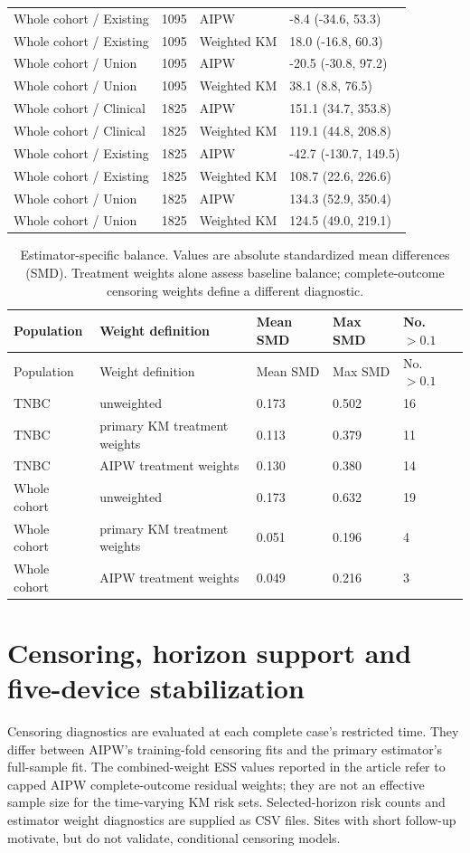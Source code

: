 \documentclass[12pt,letterpaper]{article}
\begin{document}
\begin{longtable}{p{1.6in}p{0.65in}p{1.1in}p{2.45in}}
Whole cohort / Existing & 1095 & AIPW & -8.4 (-34.6, 53.3) \\
Whole cohort / Existing & 1095 & Weighted KM & 18.0 (-16.8, 60.3) \\
Whole cohort / Union & 1095 & AIPW & -20.5 (-30.8, 97.2) \\
Whole cohort / Union & 1095 & Weighted KM & 38.1 (8.8, 76.5) \\
Whole cohort / Clinical & 1825 & AIPW & 151.1 (34.7, 353.8) \\
Whole cohort / Clinical & 1825 & Weighted KM & 119.1 (44.8, 208.8) \\
Whole cohort / Existing & 1825 & AIPW & -42.7 (-130.7, 149.5) \\
Whole cohort / Existing & 1825 & Weighted KM & 108.7 (22.6, 226.6) \\
Whole cohort / Union & 1825 & AIPW & 134.3 (52.9, 350.4) \\
Whole cohort / Union & 1825 & Weighted KM & 124.5 (49.0, 219.1) \\
\end{longtable}
\begin{longtable}{p{1.0in}p{2.1in}p{0.8in}p{0.8in}p{0.9in}}
\caption{Estimator-specific balance. Values are absolute standardized mean differences (SMD). Treatment weights alone assess baseline balance; complete-outcome censoring weights define a different diagnostic.}\\
\toprule
Population & Weight definition & Mean SMD & Max SMD & No. $>0.1$ \\
\midrule\endfirsthead
\toprule
Population & Weight definition & Mean SMD & Max SMD & No. $>0.1$ \\
\midrule\endhead
\bottomrule\endfoot
TNBC & unweighted & 0.173 & 0.502 & 16 \\
TNBC & primary KM treatment weights & 0.113 & 0.379 & 11 \\
TNBC & AIPW treatment weights & 0.130 & 0.380 & 14 \\
Whole cohort & unweighted & 0.173 & 0.632 & 19 \\
Whole cohort & primary KM treatment weights & 0.051 & 0.196 & 4 \\
Whole cohort & AIPW treatment weights & 0.049 & 0.216 & 3 \\
\end{longtable}
\section{Censoring, horizon support and five-device stabilization}
Censoring diagnostics are evaluated at each complete case's restricted time. They differ between AIPW's
training-fold censoring fits and the primary estimator's full-sample fit. The combined-weight ESS values
reported in the article refer to capped AIPW complete-outcome residual weights; they are not an effective
sample size for the time-varying KM risk sets. Selected-horizon risk counts and estimator weight diagnostics
are supplied as CSV files. Sites with short follow-up motivate, but do not validate, conditional censoring models.
\end{document}
